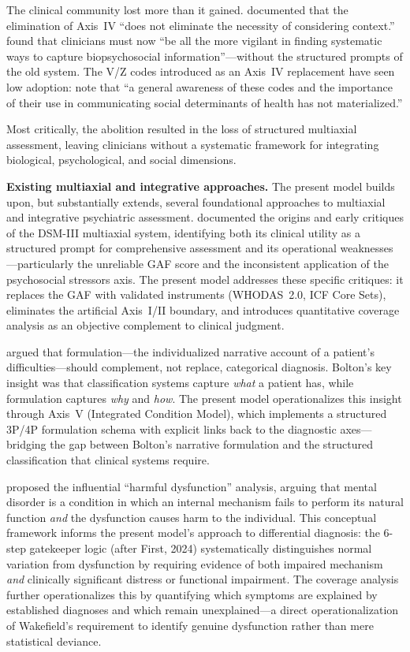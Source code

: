 \documentclass[11pt,a4paper]{article}
\begin{document}
The clinical community lost more than it gained. \citet{Probst2014} documented that the elimination of Axis~IV ``does not eliminate the necessity of considering context.'' \citet{Kress2014} found that clinicians must now ``be all the more vigilant in finding systematic ways to capture biopsychosocial information''---without the structured prompts of the old system. The V/Z codes introduced as an Axis~IV replacement have seen low adoption: \citet{ErlichFirst2025} note that ``a general awareness of these codes and the importance of their use in communicating social determinants of health has not materialized.''

Most critically, the abolition resulted in the loss of structured multiaxial assessment, leaving clinicians without a systematic framework for integrating biological, psychological, and social dimensions.

\textbf{Existing multiaxial and integrative approaches.} The present model builds upon, but substantially extends, several foundational approaches to multiaxial and integrative psychiatric assessment. \citet{Williams1985} documented the origins and early critiques of the DSM-III multiaxial system, identifying both its clinical utility as a structured prompt for comprehensive assessment and its operational weaknesses---particularly the unreliable GAF score and the inconsistent application of the psychosocial stressors axis. The present model addresses these specific critiques: it replaces the GAF with validated instruments (WHODAS~2.0, ICF Core Sets), eliminates the artificial Axis~I/II boundary, and introduces quantitative coverage analysis as an objective complement to clinical judgment.

\citet{Bolton2008} argued that formulation---the individualized narrative account of a patient's difficulties---should complement, not replace, categorical diagnosis. Bolton's key insight was that classification systems capture \textit{what} a patient has, while formulation captures \textit{why} and \textit{how}. The present model operationalizes this insight through Axis~V (Integrated Condition Model), which implements a structured 3P/4P formulation schema with explicit links back to the diagnostic axes---bridging the gap between Bolton's narrative formulation and the structured classification that clinical systems require.

\citet{Wakefield1992} proposed the influential ``harmful dysfunction'' analysis, arguing that mental disorder is a condition in which an internal mechanism fails to perform its natural function \textit{and} the dysfunction causes harm to the individual. This conceptual framework informs the present model's approach to differential diagnosis: the 6-step gatekeeper logic (after First, 2024) systematically distinguishes normal variation from dysfunction by requiring evidence of both impaired mechanism \textit{and} clinically significant distress or functional impairment. The coverage analysis further operationalizes this by quantifying which symptoms are explained by established diagnoses and which remain unexplained---a direct operationalization of Wakefield's requirement to identify genuine dysfunction rather than mere statistical deviance.
\end{document}
